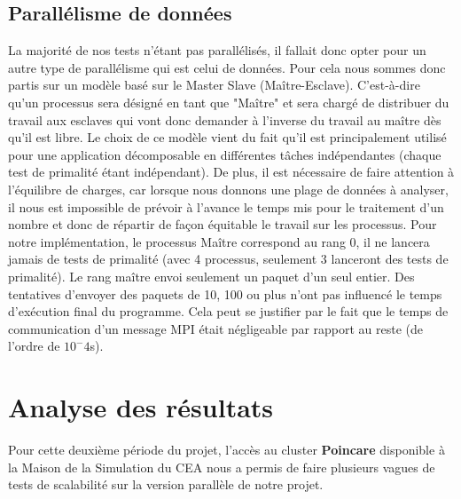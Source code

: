 		\subsection{Parallélisme de données}
		La majorité de nos tests n'étant pas parallélisés, il fallait donc opter pour un autre type de parallélisme qui est celui de données. Pour cela nous sommes donc partis sur un modèle basé sur le Master Slave (Maître-Esclave). C'est-à-dire qu'un processus sera désigné en tant que "Maître" et sera chargé de distribuer du travail aux esclaves qui vont donc demander à l'inverse du travail au maître dès qu'il est libre. Le choix de ce modèle vient du fait qu'il est principalement utilisé pour une application décomposable en différentes tâches indépendantes (chaque test de primalité étant indépendant). De plus, il est nécessaire de faire attention à l'équilibre de charges, car lorsque nous donnons une plage de données à analyser, il nous est impossible de prévoir à l'avance le temps mis pour le traitement d'un nombre et donc de répartir de façon équitable le travail sur les processus. 
Pour notre implémentation, le processus Maître correspond au rang 0, il ne lancera jamais de tests de primalité (avec 4 processus, seulement 3 lanceront des tests de primalité). Le rang maître envoi seulement un paquet d'un seul entier. Des tentatives d'envoyer des paquets de 10, 100 ou plus n'ont pas influencé le temps d'exécution final du programme. Cela peut se justifier par le fait que le temps de communication d'un message MPI était négligeable par rapport au reste (de l'ordre de $10^-4$s).

	\section{Analyse des résultats}
	Pour cette deuxième période du projet, l'accès au cluster \textbf{Poincare}\cite{poincare} disponible à la Maison de la Simulation du CEA nous a permis de faire plusieurs vagues de tests de scalabilité sur la version parallèle de notre projet.
	
